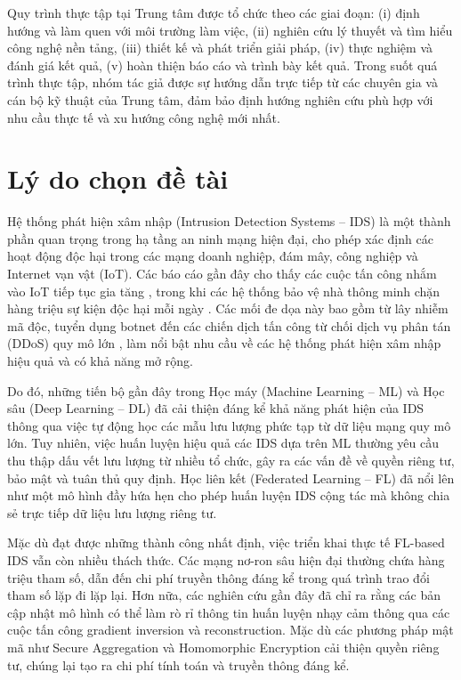 Quy trình thực tập tại Trung tâm được tổ chức theo các giai đoạn: (i) định hướng và làm quen với môi trường làm việc, (ii) nghiên cứu lý thuyết và tìm hiểu công nghệ nền tảng, (iii) thiết kế và phát triển giải pháp, (iv) thực nghiệm và đánh giá kết quả, (v) hoàn thiện báo cáo và trình bày kết quả. Trong suốt quá trình thực tập, nhóm tác giả được sự hướng dẫn trực tiếp từ các chuyên gia và cán bộ kỹ thuật của Trung tâm, đảm bảo định hướng nghiên cứu phù hợp với nhu cầu thực tế và xu hướng công nghệ mới nhất.

\section{Lý do chọn đề tài}
\label{sec:reason}

Hệ thống phát hiện xâm nhập (Intrusion Detection Systems -- IDS) là một thành phần quan trọng trong hạ tầng an ninh mạng hiện đại, cho phép xác định các hoạt động độc hại trong các mạng doanh nghiệp, đám mây, công nghiệp và Internet vạn vật (IoT). Các báo cáo gần đây cho thấy các cuộc tấn công nhắm vào IoT tiếp tục gia tăng \cite{sonicwall2024report}, trong khi các hệ thống bảo vệ nhà thông minh chặn hàng triệu sự kiện độc hại mỗi ngày \cite{netgear2024report}. Các mối đe dọa này bao gồm từ lây nhiễm mã độc, tuyển dụng botnet đến các chiến dịch tấn công từ chối dịch vụ phân tán (DDoS) quy mô lớn \cite{hackernews2026report}, làm nổi bật nhu cầu về các hệ thống phát hiện xâm nhập hiệu quả và có khả năng mở rộng.

Do đó, những tiến bộ gần đây trong Học máy (Machine Learning -- ML) và Học sâu (Deep Learning -- DL) đã cải thiện đáng kể khả năng phát hiện của IDS thông qua việc tự động học các mẫu lưu lượng phức tạp từ dữ liệu mạng quy mô lớn. Tuy nhiên, việc huấn luyện hiệu quả các IDS dựa trên ML thường yêu cầu thu thập dấu vết lưu lượng từ nhiều tổ chức, gây ra các vấn đề về quyền riêng tư, bảo mật và tuân thủ quy định. Học liên kết (Federated Learning -- FL) \cite{fedavg} đã nổi lên như một mô hình đầy hứa hẹn cho phép huấn luyện IDS cộng tác mà không chia sẻ trực tiếp dữ liệu lưu lượng riêng tư.

Mặc dù đạt được những thành công nhất định, việc triển khai thực tế FL-based IDS vẫn còn nhiều thách thức. Các mạng nơ-ron sâu hiện đại thường chứa hàng triệu tham số, dẫn đến chi phí truyền thông đáng kể trong quá trình trao đổi tham số lặp đi lặp lại. Hơn nữa, các nghiên cứu gần đây đã chỉ ra rằng các bản cập nhật mô hình có thể làm rò rỉ thông tin huấn luyện nhạy cảm thông qua các cuộc tấn công gradient inversion và reconstruction. Mặc dù các phương pháp mật mã như Secure Aggregation \cite{bonawitz2016secagg} và Homomorphic Encryption \cite{li2020deepfed} cải thiện quyền riêng tư, chúng lại tạo ra chi phí tính toán và truyền thông đáng kể.

